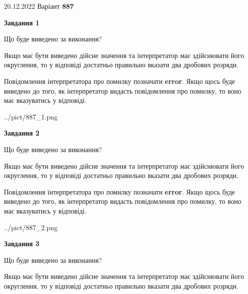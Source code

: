 \documentclass[12pt, ukrainian]{article}
\begin{document}
{20.12.2022 Варіант \No \textbf { 887 }\par}
{
\begin {Large}

{\begin {center}\textbf{Завдання 1}\end {center}}\par
Що буде виведено за виконання? \par

Якщо має бути виведено дійсне значення та інтерпретатор має здійснювати його округлення, 
то у відповіді достатньо правильно вказати два дробових розряди.

Повідомлення інтерпретатора про помилку позначати \textbf{error}.
Якщо щось буде виведено до того, як інтерпретатор видасть повідомлення про помилку, 
то воно має вказуватись у відповіді. \par

\begin{center}
	{../pict/887_1.png}
\end{center}
\newpage

{\begin {center}\textbf{Завдання 2}\end {center}}\par
Що буде виведено за виконання? \par

Якщо має бути виведено дійсне значення та інтерпретатор має здійснювати його округлення, 
то у відповіді достатньо правильно вказати два дробових розряди.

Повідомлення інтерпретатора про помилку позначати \textbf{error}.
Якщо щось буде виведено до того, як інтерпретатор видасть повідомлення про помилку, 
то воно має вказуватись у відповіді. \par

\begin{center}
	{../pict/887_2.png}
\end{center}
\newpage

{\begin {center}\textbf{Завдання 3}\end {center}}\par
Що буде виведено за виконання? \par

Якщо має бути виведено дійсне значення та інтерпретатор має здійснювати його округлення, 
то у відповіді достатньо правильно вказати два дробових розряди.


\end{Large}}
\end{document}
